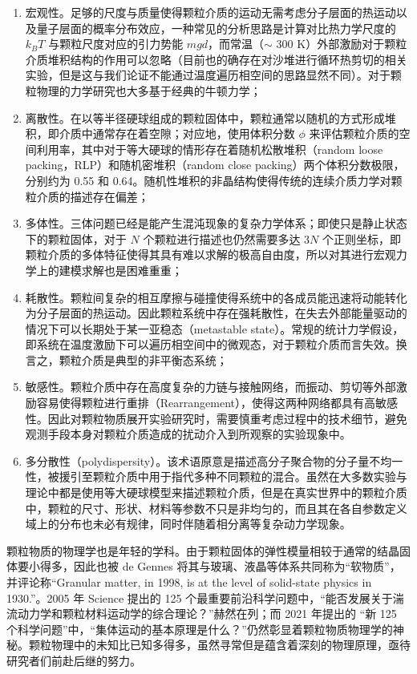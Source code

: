 \begin{enumerate}
  \item 宏观性。足够的尺度与质量使得颗粒介质的运动无需考虑分子层面的热运动以及量子层面的概率分布效应，一种常见的分析思路是计算对比热力学尺度的 $k_{B}T$ 与颗粒尺度对应的引力势能 $mgd$，而常温（$\sim$ 300 \unit{\kelvin}）外部激励对于颗粒介质堆积结构的作用可以忽略（目前也的确存在对沙堆进行循环热剪切的相关实验\cite{YIN2023100503}，但是这与我们论证不能通过温度遍历相空间的思路显然不同）。对于颗粒物理的力学研究也大多基于经典的牛顿力学；
  \item 离散性。在以等半径硬球组成的颗粒固体中，颗粒通常以随机的方式形成堆积，即介质中通常存在着空隙；对应地，使用体积分数 $\phi$ 来评估颗粒介质的空间利用率，其中对于等大硬球的情形存在着随机松散堆积（random loose packing，RLP）和随机密堆积（random close packing）两个体积分数极限，分别约为 0.55\cite{PhysRevLett.64.2727} 和 0.64\cite{RevModPhys.82.789}。随机性堆积的非晶结构使得传统的连续介质力学对颗粒介质的描述存在偏差\cite{RevModPhys.71.435}；
  \item 多体性。三体问题已经是能产生混沌现象的复杂力学体系；即使只是静止状态下的颗粒固体，对于 $N$ 个颗粒进行描述也仍然需要多达 $3N$ 个正则坐标，即颗粒介质的多体特征使得其具有难以求解的极高自由度，所以对其进行宏观力学上的建模求解也是困难重重；
  \item 耗散性。颗粒间复杂的相互摩擦与碰撞使得系统中的各成员能迅速将动能转化为分子层面的热运动。因此颗粒系统中存在强耗散性，在失去外部能量驱动的情况下可以长期处于某一亚稳态（metastable state）。常规的统计力学假设，即系统在温度激励下可以遍历相空间中的微观态，对于颗粒介质而言失效。换言之，颗粒介质是典型的非平衡态系统；
  \item 敏感性。颗粒介质中存在高度复杂的力链与接触网络，而振动、剪切等外部激励容易使得颗粒进行重排（Rearrangement），使得这两种网络都具有高敏感性。因此对颗粒物质展开实验研究时，需要慎重考虑过程中的技术细节，避免观测手段本身对颗粒介质造成的扰动介入到所观察的实验现象中。
  \item 多分散性（polydispersity）。该术语原意是描述高分子聚合物的分子量不均一性，被援引至颗粒介质中用于指代多种不同颗粒的混合。虽然在大多数实验与理论中都是使用等大硬球模型来描述颗粒介质，但是在真实世界中的颗粒介质中，颗粒的尺寸、形状\cite{vandenwildenbergProbingEffectParticle2015,xingyi}、材料等参数不只是非均匀的，而且其在各自参数定义域上的分布也未必有规律，同时伴随着相分离\cite{doi:10.1126/sciadv.abe8737}等复杂动力学现象。
\end{enumerate}

颗粒物质的物理学也是年轻的学科。由于颗粒固体的弹性模量相较于通常的结晶固体要小得多，因此也被 de Gennes 将其与玻璃、液晶等体系共同称为“软物质”，并评论称“Granular matter, in 1998, is at the level of solid-state physics in 1930.”\cite{RevModPhys.71.S374}。2005 年 Science 提出的 125 个最重要前沿科学问题\cite{doi:10.1126/science.309.5731.78b}中，“能否发展关于湍流动力学和颗粒材料运动学的综合理论？”赫然在列；而 2021 年提出的 “新 125 个科学问题”\cite{sanders2021125}中，“集体运动的基本原理是什么？”仍然彰显着颗粒物质物理学的神秘。颗粒物理中的未知比已知多得多，虽然寻常但是蕴含着深刻的物理原理，亟待研究者们前赴后继的努力。

